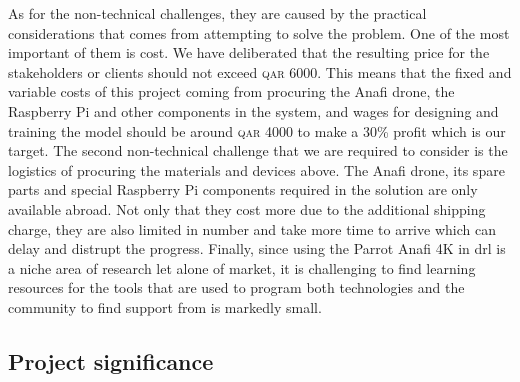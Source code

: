 \documentclass[../main.tex]{subfiles}
\begin{document}
As for the non-technical challenges, they are caused
by the practical considerations that comes 
from attempting to solve the problem.
One of the most important of them is cost. 
We have deliberated that
the resulting price for the stakeholders or clients
should not exceed \textsc{qar} 6000. 
This means that the fixed and variable costs of this project
coming from procuring the Anafi drone, the Raspberry Pi and other
components in the system, 
and wages for designing and training the model
should be around \textsc{qar} 4000 to make a 30\% profit 
which is our target.
The second non-technical challenge that we are required to consider
is the logistics of procuring the materials and devices above.
The Anafi drone, its spare parts and special Raspberry Pi
components required in the solution are only available abroad.
Not only that they cost more due to the additional shipping charge,
they are also limited in number 
and take more time to arrive which can delay 
and distrupt the progress.
Finally, since using the Parrot Anafi 4K in \gls{drl}
is a niche area of research let alone of market,
it is challenging to find learning resources for the tools
that are used to program both technologies
and the community to find support from is markedly small.



\blindtext

\subsection{Project significance}
\end{document}
